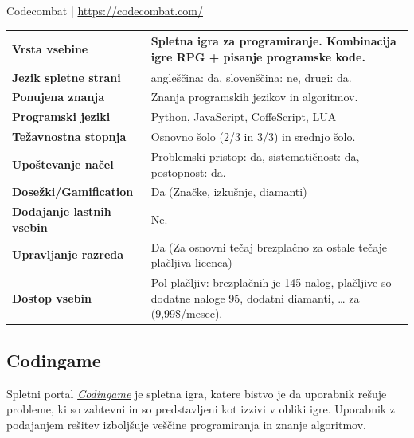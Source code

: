 \begin{osebnabox}[label={osebna:codecombat}]{Codecombat |
    \url{https://codecombat.com/}}
    \begin{tabular}{
  p{} |
  p{}  }
  \textbf{Vrsta vsebine} & Spletna igra za programiranje. Kombinacija
                           igre RPG + pisanje programske kode. \\
      \hline
  \textbf{Jezik spletne strani} & angleščina: da, slovenščina: ne,
                                  drugi: da. \\
      \hline
  \textbf{Ponujena znanja} & Znanja programskih jezikov in  algoritmov. \\
      \hline
 \textbf{Programski jeziki} & Python, JavaScript, CoffeScript, LUA \\  
      \hline
  \textbf{Težavnostna stopnja} & Osnovno šolo (2/3 in 3/3) in srednjo
                                 šolo. \\ 
      \hline
   \textbf{Upoštevanje načel} & Problemski pristop: da,
                                sistematičnost: da, postopnost: da. \\
      \hline
  \textbf{Dosežki/Gamification} & Da (Značke, izkušnje, diamanti) \\
      \hline
  \textbf{Dodajanje lastnih vsebin} & Ne. \\
      \hline
  \textbf{Upravljanje razreda} & Da (Za osnovni tečaj brezplačno za
                                 ostale tečaje plačljiva licenca) \\ 
      \hline
  \textbf{Dostop vsebin} & Pol plačljiv: brezplačnih je 145 nalog,
                           plačljive so dodatne naloge 95, dodatni
                           diamanti, … za (9,99\$/mesec).   \\  

\end{tabular}
\end{osebnabox}

\subsection{Codingame}
\label{sec:codingame}

Spletni portal \emph{\href{https://www.codingame.com}{Codingame}}
\cite{web:codingame} je spletna igra, katere bistvo je da uporabnik
rešuje probleme, ki so zahtevni in so predstavljeni kot izzivi v
obliki igre. Uporabnik z podajanjem rešitev izboljšuje veščine
programiranja in znanje algoritmov.

